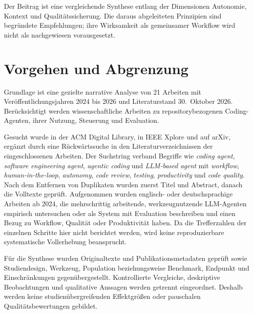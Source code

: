 \documentclass[conference]{IEEEtran}
\begin{document}
Der Beitrag ist eine vergleichende Synthese entlang der Dimensionen Autonomie, Kontext und Qualitätssicherung. Die daraus abgeleiteten Prinzipien sind begründete Empfehlungen; ihre Wirksamkeit als gemeinsamer Workflow wird nicht als nachgewiesen vorausgesetzt.

\section{Vorgehen und Abgrenzung}
Grundlage ist eine gezielte narrative Analyse von 21 Arbeiten mit Veröffentlichungsjahren 2024 bis 2026 und Literaturstand 30.~Oktober 2026. Berücksichtigt werden wissenschaftliche Arbeiten zu repositorybezogenen Coding-Agenten, ihrer Nutzung, Steuerung und Evaluation.

Gesucht wurde in der ACM Digital Library, in IEEE Xplore und auf arXiv, ergänzt durch eine Rückwärtssuche in den Literaturverzeichnissen der eingeschlossenen Arbeiten. Der Suchstring verband Begriffe wie \emph{coding agent}, \emph{software engineering agent}, \emph{agentic coding} und \emph{LLM-based agent} mit \emph{workflow}, \emph{human-in-the-loop}, \emph{autonomy}, \emph{code review}, \emph{testing}, \emph{productivity} und \emph{code quality}. Nach dem Entfernen von Duplikaten wurden zuerst Titel und Abstract, danach die Volltexte geprüft. Aufgenommen wurden englisch- oder deutschsprachige Arbeiten ab 2024, die mehrschrittig arbeitende, werkzeugnutzende LLM-Agenten empirisch untersuchen oder als System mit Evaluation beschreiben und einen Bezug zu Workflow, Qualität oder Produktivität haben. Da die Trefferzahlen der einzelnen Schritte hier nicht berichtet werden, wird keine reproduzierbare systematische Vollerhebung beansprucht.

Für die Synthese wurden Originaltexte und Publikationsmetadaten geprüft sowie Studiendesign, Werkzeug, Population beziehungsweise Benchmark, Endpunkt und Einschränkungen gegenübergestellt. Kontrollierte Vergleiche, deskriptive Beobachtungen und qualitative Aussagen werden getrennt eingeordnet. Deshalb werden keine studienübergreifenden Effektgrößen oder pauschalen Qualitätsbewertungen gebildet.
\end{document}
